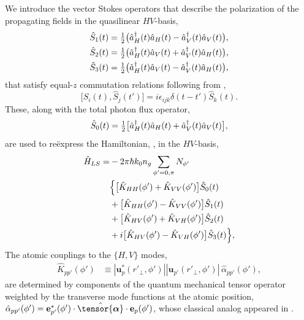 \documentclass[aps,pra,twocolumn]{revtex4-1} %
\newcommand{\poltens}{\hat{\tensor{\boldsymbol{\alpha}}}}
\newcommand{\polcomp}{\hat{K}} %
\begin{document}
We introduce the vector Stokes operators that describe the polarization of the propagating fields in the quasilinear $HV$-basis,
\begin{subequations} \label{Eq::StokesComponents}
	\begin{align}
		\hat{S}_1(t) &= \mbox{$\frac{1}{2}$}\big( \hat{a}^\dag_H(t) \hat{a}_H(t)-\hat{a}^\dag_V(t) \hat{a}_V(t) \big), \\
		\hat{S}_2(t) &= \mbox{$\frac{1}{2}$}\big( \hat{a}^\dag_H(t) \hat{a}_V(t)+\hat{a}^\dag_V(t) \hat{a}_H(t) \big), \\
		\hat{S}_3(t) &= \mbox{$\frac{1}{2}$}\big( \hat{a}^\dag_H(t) \hat{a}_V(t) -\hat{a}^\dag_V(t) \hat{a}_H(t) \big),
	\end{align}
\end{subequations}
that satisfy equal-$z$ commutation relations following from ,
	\begin{equation} \label{Eq::StokesCommutation}
		\big[\hat{S}_i(t), \hat{S}_j(t')\big] =i \epsilon_{ijk} \delta(t-t')  \hat{S}_k(t).
	\end{equation}
These, along with the total photon flux operator,
	\begin{equation}
		\hat{S}_0(t) = \mbox{$\frac{1}{2}$}\big[ \hat{a}^\dag_H(t) \hat{a}_H(t)+\hat{a}^\dag_V(t) \hat{a}_V(t) \big],
	\end{equation}
are used to re\"{e}xpress the Hamiltonian, , in the $HV$-basis,
	\begin{align}  
		\hat{H}_{LS} 	=& - 2 \pi \hbar k_0 n_g \sum_{\phi'=0,\pi}N_{\phi'} \nn\\
		&\Big\{ \big[ \polcomp_{HH}(\phi')+\polcomp_{VV}(\phi') \big] \hat{S}_0(t) \nn\\
		&+  \big[\polcomp_{HH}(\phi')  - \polcomp_{VV}(\phi')  \big] \hat{S}_1(t) \nonumber \\
&+ \big[\polcomp_{HV}(\phi') + \polcomp_{VH}(\phi')  \big] \hat{S}_2(t) \nn\\
&+ i  \big[ \polcomp_{HV}(\phi')-\polcomp_{VH}(\phi') \big]\hat{S}_3(t) \Big\}, \label{Eq::GenHamiltonian} 
	\end{align}
The atomic couplings to the $\{H,V\}$ modes,
	\begin{align} 
		\polcomp_{p p'}(\phi') & \equiv |\mathbf{u}^*_p(r'_\perp, \phi')||\mathbf{u}_{p'}(r'_\perp, \phi')| \, \hat{\alpha}_{p p'}(\phi') , 
	\end{align}
are determined by components of the quantum mechanical tensor operator weighted by the transverse mode functions at the atomic position, $\hat{\alpha}_{p p'}(\phi') = \mathbf{e}^*_{p'}(\phi') \cdot \poltens \cdot \mathbf{e}_{p}(\phi') $, whose classical analog appeared in .
\end{document}

